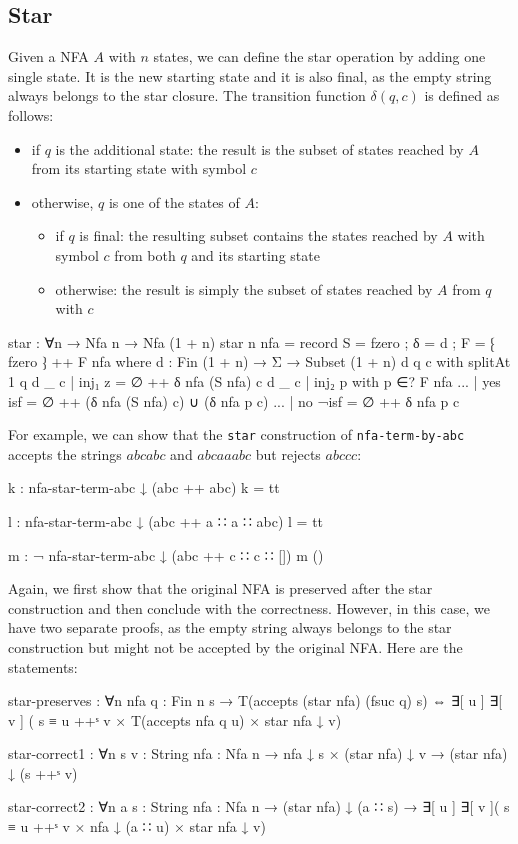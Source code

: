 \subsection{Star}
Given a NFA $A$ with $n$ states, we can define the star operation by adding one single state. It is the new starting state and it is also final, as the empty string always belongs to the star closure. The transition function $\delta(q, c)$ is defined as follows:
\begin{itemize}
    \item if $q$ is the additional state: the result is the subset of states reached by $A$ from its starting state with symbol $c$
    \item otherwise, $q$ is one of the states of $A$:
    \begin{itemize}
        \item if $q$ is final: the resulting subset contains the states reached by $A$ with symbol $c$ from both $q$ and its starting state
        \item otherwise: the result is simply the subset of states reached by $A$ from $q$ with $c$
    \end{itemize}
\end{itemize}
\begin{agda}
star : ∀{n} → Nfa n → Nfa (1 + n)
star {n} nfa =
  record { S = fzero ; δ = d ; F = ⁅ fzero ⁆ ++ F nfa }
  where
    d : Fin (1 + n) → Σ → Subset (1 + n)
    d q c with splitAt 1 q
    d _ c | inj₁ z = ∅ ++ δ nfa (S nfa) c
    d _ c | inj₂ p with p ∈? F nfa
    ... | yes isf = ∅ ++ (δ nfa (S nfa) c) ∪ (δ nfa p c)
    ... | no ¬isf = ∅ ++ δ nfa p c
\end{agda}
For example, we can show that the \texttt{star} construction of \texttt{nfa-term-by-abc} accepts the strings $abcabc$ and $abcaaabc$ but rejects $abccc$:
\begin{agda}
k : nfa-star-term-abc ↓ (abc ++ abc)
k = tt

l : nfa-star-term-abc ↓ (abc ++ a ∷ a ∷ abc)
l = tt

m : ¬ nfa-star-term-abc ↓ (abc ++ c ∷ c ∷ [])
m ()
\end{agda}
Again, we first show that the original NFA is preserved after the star construction and then conclude with the correctness. However, in this case, we have two separate proofs, as the empty string always belongs to the star construction but might not be accepted by the original NFA. Here are the statements:
\begin{agda}
star-preserves : ∀{n} {nfa} {q : Fin n} {s}
  → T(accepts (star nfa) (fsuc q) s)
    ⇔
    ∃[ u ] ∃[ v ] (
          s ≡ u ++ˢ v 
        × T(accepts nfa q u) 
        × star nfa ↓ v)

star-correct1 : ∀{n} {s v : String} {nfa : Nfa n}
  → nfa ↓ s × (star nfa) ↓ v
  → (star nfa) ↓ (s ++ˢ v)
 
star-correct2 : ∀{n} {a} {s : String} {nfa : Nfa n}
  → (star nfa) ↓ (a ∷ s)
  → ∃[ u ] ∃[ v ](
          s ≡ u ++ˢ v 
        × nfa ↓ (a ∷ u) 
        × star nfa ↓ v)
\end{agda}
